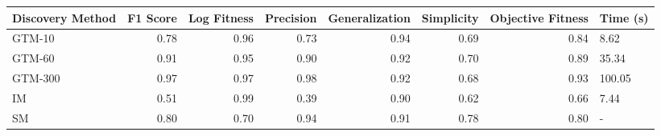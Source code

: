 \begin{tabular}{lrrrrrrl}
\toprule
Discovery Method & F1 Score & Log Fitness & Precision & Generalization & Simplicity & Objective Fitness & Time (s) \\
\midrule
GTM-10 & 0.78 & 0.96 & 0.73 & 0.94 & 0.69 & 0.84 & 8.62 \\
GTM-60 & 0.91 & 0.95 & 0.90 & 0.92 & 0.70 & 0.89 & 35.34 \\
GTM-300 & 0.97 & 0.97 & 0.98 & 0.92 & 0.68 & 0.93 & 100.05 \\
IM & 0.51 & 0.99 & 0.39 & 0.90 & 0.62 & 0.66 & 7.44 \\
SM & 0.80 & 0.70 & 0.94 & 0.91 & 0.78 & 0.80 & - \\
\bottomrule
\end{tabular}
